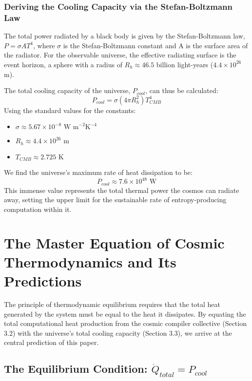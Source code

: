 \documentclass[12pt, aip, jcp]{revtex4-2} %
\begin{document}
\subsubsection{Deriving the Cooling Capacity via the Stefan-Boltzmann Law}

The total power radiated by a black body is given by the Stefan-Boltzmann law, \(P = \sigma A T^4\), where \(\sigma\) is the Stefan-Boltzmann constant and A is the surface area of the radiator. For the observable universe, the effective radiating surface is the event horizon, a sphere with a radius of \(R_h \approx 46.5\) billion light-years (\(4.4 \times 10^{26}\) m).

The total cooling capacity of the universe, \(P_{cool}\), can thus be calculated:
\begin{equation}
    P_{cool} = \sigma (4 \pi R_h^2) T_{CMB}^4
\end{equation}
Using the standard values for the constants:
\begin{itemize}
    \item \(\sigma \approx 5.67 \times 10^{-8} \text{ W m}^{-2} \text{K}^{-4}\)
    \item \(R_h \approx 4.4 \times 10^{26} \text{ m}\)
    \item \(T_{CMB} \approx 2.725 \text{ K}\)
\end{itemize}
We find the universe's maximum rate of heat dissipation to be:
\begin{equation}
    P_{cool} \approx 7.6 \times 10^{48} \text{ W}
\end{equation}
This immense value represents the total thermal power the cosmos can radiate away, setting the upper limit for the sustainable rate of entropy-producing computation within it.

\section{The Master Equation of Cosmic Thermodynamics and Its Predictions}

The principle of thermodynamic equilibrium requires that the total heat generated by the system must be equal to the heat it dissipates. By equating the total computational heat production from the cosmic compiler collective (Section 3.2) with the universe's total cooling capacity (Section 3.3), we arrive at the central prediction of this paper.

\subsection{The Equilibrium Condition: \(\dot{Q}_{total} = P_{cool}\)}
\end{document}
